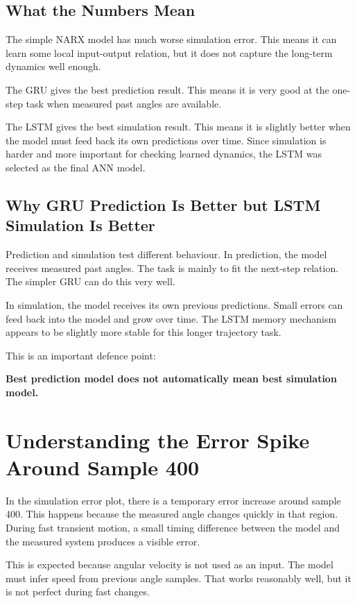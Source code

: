 \documentclass[11pt,a4paper]{article}
\begin{document}
\subsection{What the Numbers Mean}

The simple NARX model has much worse simulation error.
This means it can learn some local input-output relation, but it does not capture the long-term dynamics well enough.

The GRU gives the best prediction result.
This means it is very good at the one-step task when measured past angles are available.

The LSTM gives the best simulation result.
This means it is slightly better when the model must feed back its own predictions over time.
Since simulation is harder and more important for checking learned dynamics, the LSTM was selected as the final ANN model.

\subsection{Why GRU Prediction Is Better but LSTM Simulation Is Better}

Prediction and simulation test different behaviour.
In prediction, the model receives measured past angles.
The task is mainly to fit the next-step relation.
The simpler GRU can do this very well.

In simulation, the model receives its own previous predictions.
Small errors can feed back into the model and grow over time.
The LSTM memory mechanism appears to be slightly more stable for this longer trajectory task.

This is an important defence point:

\begin{center}
\textbf{Best prediction model does not automatically mean best simulation model.}
\end{center}

\section{Understanding the Error Spike Around Sample 400}

In the simulation error plot, there is a temporary error increase around sample 400.
This happens because the measured angle changes quickly in that region.
During fast transient motion, a small timing difference between the model and the measured system produces a visible error.

This is expected because angular velocity is not used as an input.
The model must infer speed from previous angle samples.
That works reasonably well, but it is not perfect during fast changes.
\end{document}
